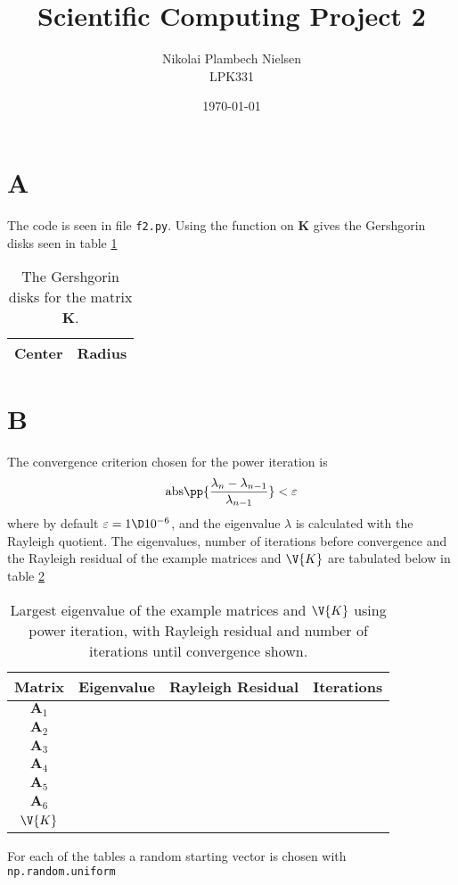 \documentclass[a4paper,10pt]{article}
\title{Scientific Computing Project 2}
\author{Nikolai Plambech Nielsen\\LPK331}
\date{\today}
\begin{document}
	\maketitle
	\section*{A}
	The code is seen in file \texttt{f2.py}. Using the function on $ \textbf{K} $ gives the Gershgorin disks seen in table \ref{tab:disks}
	\begin{table}[H]
		\centering
		\begin{tabular}{c|c}
			Center & Radius \\
			\hline
			
		\end{tabular}
	\caption{The Gershgorin disks for the matrix $ \textbf{K} $.}
	\label{tab:disks}
	\end{table}
	
	\section*{B}
	The convergence criterion chosen for the power iteration is
	\begin{equation}\label{key}
		\text{abs}\pp{\frac{\lambda_{n} - \lambda_{n-1}}{\lambda_{n-1}}} < \varepsilon
	\end{equation}
	where by default $ \varepsilon = 1\D 10^{-6} $, and the eigenvalue $ \lambda $ is calculated with the Rayleigh quotient. The eigenvalues, number of iterations before convergence and the Rayleigh residual of the example matrices and $ \V{K} $ are tabulated below in table \ref{tab:power_iter}
	\begin{table}[H]
		\centering
		\begin{tabular}{c|c|c|c}
			Matrix & Eigenvalue & Rayleigh Residual & Iterations \\
			\hline
			$ \textbf{A}_1 $ & & & \\
			$ \textbf{A}_2 $ & & & \\
			$ \textbf{A}_3 $ & & & \\
			$ \textbf{A}_4 $ & & & \\
			$ \textbf{A}_5 $ & & & \\
			$ \textbf{A}_6 $ & & & \\
			$ \V{K} $ & & &
		\end{tabular}
		\caption{Largest eigenvalue of the example matrices and $ \V{K} $ using power iteration, with Rayleigh residual and number of iterations until convergence shown.}
		\label{tab:power_iter}
	\end{table}
	For each of the tables a random starting vector is chosen with \texttt{np.random.uniform}
	
\end{document}

